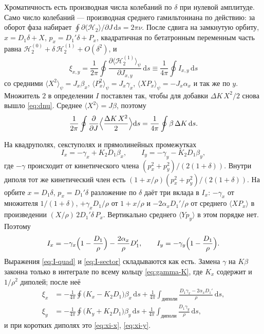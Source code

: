 Хроматичность есть производная числа колебаний по $\delta$ при нулевой амплитуде. Само число колебаний --- производная среднего гамильтониана по действию: за оборот фаза набирает $\oint\partial\langle\mathcal{H}_2\rangle/\partial J\,\mathrm{d}s=2\pi\nu$. После сдвига на замкнутую орбиту, $x=D_1\delta+X$, $p_x=D_1'\delta+P_x$, квадратичная по бетатронным переменным часть равна $\mathcal{H}_2^{(0)}+\delta\,\mathcal{H}_2^{(1)}+O(\delta^2)$, и
\begin{equation}
\label{eq:xi-ham-mag}
\xi_{x,y}
=\frac{1}{2\pi}\oint\frac{\partial\langle\mathcal{H}_2^{(1)}\rangle_\psi}{\partial J_{x,y}}\,\mathrm{d}s
\equiv\frac{1}{4\pi}\oint I_{x,y}\,\mathrm{d}s
\end{equation}
со средними $\langle X^2\rangle_\psi=J_x\beta_x$, $\langle P_x^2\rangle_\psi=J_x\gamma_x$, $\langle XP_x\rangle_\psi=-J_x\alpha_x$ и так же по $y$. Множитель $2$ в определении $I$ поставлен так, чтобы для добавки $\Delta K\,X^2/2$ снова вышло \eqref{eq:dnu}. Среднее $\langle X^2\rangle=J\beta$, поэтому
\begin{equation*}
\frac{1}{2\pi}\oint\frac{\partial}{\partial J}\Bigl\langle\frac{\Delta K\,X^2}{2}\Bigr\rangle\mathrm{d}s
=\frac{1}{4\pi}\oint\beta\,\Delta K\,\mathrm{d}s.
\end{equation*}

На квадруполях, секступолях и прямолинейных промежутках
\begin{equation}
\label{eq:I-quad}
I_x=-\gamma_x+K_2D_1\beta_x,
\qquad
I_y=-\gamma_y-K_2D_1\beta_y,
\end{equation}
где $-\gamma$ происходит от кинетического члена $(p_x^2+p_y^2)/(2(1+\delta))$. Внутри диполя тот же кинетический член есть $(1+x/\rho)(p_x^2+p_y^2)/(2(1+\delta))$. На орбите $x=D_1\delta$, $p_x=D_1'\delta$ разложение по $\delta$ даёт три вклада в $I_x$: $-\gamma_x$ от множителя $1/(1+\delta)$, $+\gamma_x D_1/\rho$ от $1+x/\rho$ и $-2\alpha_x D_1'/\rho$ от среднего $\langle XP_x\rangle$ в произведении $(X/\rho)\,2D_1'\delta\,P_x$. Вертикально среднего $\langle Y p_y\rangle$ в этом порядке нет. Поэтому
\begin{equation}
\label{eq:I-sector}
I_x=-\gamma_x\Bigl(1-\frac{D_1}{\rho}\Bigr)-\frac{2\alpha_x}{\rho}D_1',
\qquad
I_y=-\gamma_y\Bigl(1-\frac{D_1}{\rho}\Bigr).
\end{equation}
Выражения \eqref{eq:I-quad} и \eqref{eq:I-sector} складываются как есть. Замена $\gamma$ на $K\beta$ законна только в интеграле по всему кольцу \eqref{eq:gamma-K}, где $K_x$ содержит и $1/\rho^2$ диполей; после неё
\begin{equation}
\label{eq:xi-sector}
\begin{aligned}
\xi_x
&=-\frac{1}{4\pi}\oint\bigl(K_x-K_2D_1\bigr)\beta_x\,\mathrm{d}s
+\frac{1}{4\pi}\int_{\text{диполи}}\frac{D_1\gamma_x-2\alpha_xD_1'}{\rho}\,\mathrm{d}s,\\
\xi_y
&=-\frac{1}{4\pi}\oint\bigl(K_y+K_2D_1\bigr)\beta_y\,\mathrm{d}s
+\frac{1}{4\pi}\int_{\text{диполи}}\frac{D_1\gamma_y}{\rho}\,\mathrm{d}s,
\end{aligned}
\end{equation}
и при коротких диполях это \eqref{eq:xi-x}, \eqref{eq:xi-y}.

